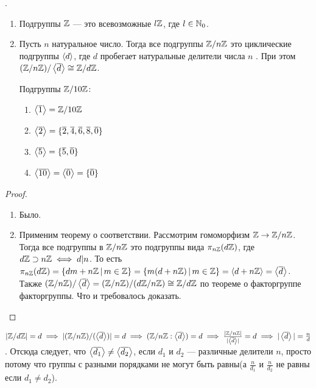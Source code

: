 \documentclass[../main.tex]{subfiles}
\begin{document}
.
  \begin{enumerate}
    \item Подгруппы $\mathbb{Z}$ --- это всевозможные $l\mathbb{Z}$, где $l \in \mathbb{N}_0$.
    \item Пусть $n$ натуральное число. Тогда все подгруппы $\mathbb{Z}/n\mathbb{Z}$ это циклические подгруппы $\left\langle d \right\rangle$, где $d$ пробегает натуральные делители числа $n$ . При этом $(\mathbb{Z}/n\mathbb{Z})/\left\langle \overline{d} \right\rangle \cong \mathbb{Z}/d\mathbb{Z}$.
    \begin{example}
      Подгруппы $\mathbb{Z}/10\mathbb{Z}\colon$
      \begin{enumerate}
        \item $\left\langle \overline{1} \right\rangle = \mathbb{Z}/10\mathbb{Z}$
        \item $\left\langle \overline{2} \right\rangle = \{\overline{2}, \overline{4}, \overline{6}, \overline{8}, \overline{0}\}$
        \item $\left\langle \overline{5} \right\rangle = \{\overline{5}, \overline{0}\}$
        \item $\left\langle \overline{10} \right\rangle = \left\langle \overline{0} \right\rangle = \{\overline{0}\}$
      \end{enumerate}
    \end{example}
  \end{enumerate}

\begin{proof}
  \begin{enumerate}
    \item Было.
    \item Применим теорему о соответствии. Рассмотрим гомоморфизм $\mathbb{Z} \to \mathbb{Z}/n\mathbb{Z}$. Тогда все подгруппы в $\mathbb{Z}/n\mathbb{Z}$ это подгруппы вида $\pi_{n\mathbb{Z}}(d\mathbb{Z})$, где $d\mathbb{Z} \supset n\mathbb{Z} \iff d | n$. То есть $\pi_{n\mathbb{Z}}(d\mathbb{Z}) = \{dm + n\mathbb{Z} \, | \, m \in \mathbb{Z}\} = \{m(d + n\mathbb{Z}) \, | \, m \in \mathbb{Z}\} =
    \left\langle d + n\mathbb{Z} \right\rangle = \left\langle \overline{d} \right\rangle$. Также $(\mathbb{Z}/n\mathbb{Z}) / \left\langle \overline{d} \right\rangle = (\mathbb{Z}/n\mathbb{Z}) / (d\mathbb{Z}/n\mathbb{Z}) \cong \mathbb{Z}/d\mathbb{Z}$ по теореме о факторгруппе факторгруппы. Что и требовалось доказать.
  \end{enumerate}
\end{proof}

\begin{remark}
  $|\mathbb{Z}/d\mathbb{Z}| = d \implies |(\mathbb{Z}/n\mathbb{Z})/(\left\langle \overline{d} \right\rangle)| = d \implies
  (\mathbb{Z}/n\mathbb{Z} : \left\langle \overline{d} \right\rangle) = d \implies \frac{|\mathbb{Z}/n\mathbb{Z}|}{|\left\langle \overline{d} \right\rangle|} = d \implies |\left\langle \overline{d} \right\rangle| = \frac{n}{d}$. Отсюда следует, что $\left\langle \overline{d_1} \right\rangle \neq \left\langle \overline{d_2} \right\rangle$, если $d_1$ и $d_2$ --- различные делители $n$, просто потому что группы с разными порядками не могут быть равны(а $\frac{n}{d_1}$ и $\frac{n}{d_2}$ не равны если $d_1 \neq d_2$).
\end{remark}
\end{document}

